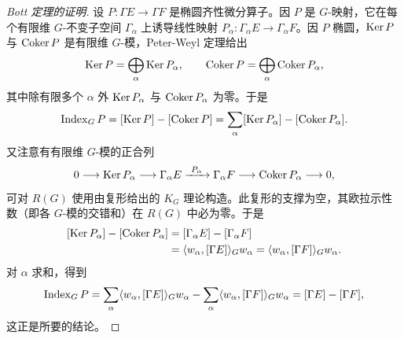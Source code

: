 \begin{proof}[Bott 定理的证明]
设 $P:\Gamma E\to\Gamma F$ 是椭圆齐性微分算子。因 $P$ 是 $G$-映射，它在每个有限维 $G$-不变子空间 $\Gamma_\alpha$ 上诱导线性映射 $P_\alpha:\Gamma_\alpha E\to\Gamma_\alpha F$。因 $P$ 椭圆，$\operatorname{Ker} P$ 与 $\operatorname{Coker} P$ 是有限维 $G$-模，Peter-Weyl 定理给出
\[
\operatorname{Ker} P=\bigoplus_\alpha\operatorname{Ker} P_\alpha,\qquad
\operatorname{Coker} P=\bigoplus_\alpha\operatorname{Coker} P_\alpha,
\]
其中除有限多个 $\alpha$ 外 $\operatorname{Ker} P_\alpha$ 与 $\operatorname{Coker} P_\alpha$ 为零。于是
\[
\operatorname{Index}_G P=[\operatorname{Ker} P]-[\operatorname{Coker} P]=\sum_\alpha[\operatorname{Ker} P_\alpha]-[\operatorname{Coker} P_\alpha].
\]
又注意有有限维 $G$-模的正合列
\[
0\longrightarrow\operatorname{Ker} P_\alpha\longrightarrow\Gamma_\alpha E
\xrightarrow{\ P_\alpha\ }\Gamma_\alpha F\longrightarrow\operatorname{Coker} P_\alpha\longrightarrow 0,
\]
可对 $R(G)$ 使用由复形给出的 $K_G$ 理论构造。此复形的支撑为空，其欧拉示性数（即各 $G$-模的交错和）在 $R(G)$ 中必为零。于是
\[
\begin{aligned}
[\Ker P_\alpha]-[\Coker P_\alpha]
&=[\Gamma_\alpha E]-[\Gamma_\alpha F]\\
&=\ip{w_\alpha}{[\Gamma E]}_G w_\alpha=\ip{w_\alpha}{[\Gamma F]}_G w_\alpha.
\end{aligned}
\]
对 $\alpha$ 求和，得到
\[
\operatorname{Index}_G P=\sum_\alpha\langle w_\alpha,[\Gamma E]\rangle_G w_\alpha-\sum_\alpha\langle w_\alpha,[\Gamma F]\rangle_G w_\alpha=[\Gamma E]-[\Gamma F],
\]
这正是所要的结论。
\end{proof}

